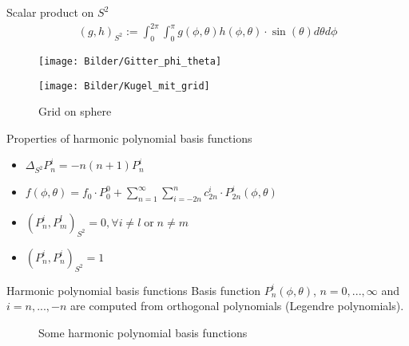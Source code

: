 \begin{frame}
	Scalar product on $S^2$
	\begin{align*}
		(g,h)_{S^2} := \int_{0}^{2\pi} \int_{0}^{\pi} g(\phi, \theta) h(\phi, \theta) \cdot \sin(\theta) d\theta d\phi
	\end{align*}

	\begin{figure}
		\small
		\begin{minipage}{0.46\textwidth}
			\texttt{[image: Bilder/Gitter\_phi\_theta]}
		\end{minipage}
		\hfill 
		\begin{minipage}{0.5\textwidth}
			\texttt{[image: Bilder/Kugel\_mit\_grid]}
		\end{minipage}
	\caption{Grid on sphere}
	\end{figure}
\end{frame}




\begin{frame}{Properties of harmonic polynomial basis functions}
	\begin{itemize}
		\item $\Delta_{S^2}P^i_n = -n(n+1) P^i_n$
		\vspace{12pt}
		\item $	f(\phi, \theta) = f_0 \cdot P_0^0 + \sum_{n=1}^{\infty} \sum_{i=-2n}^{n} c^i_{2n} \cdot P^i_{2n}(\phi, \theta)$
		\vspace{12pt}
		\item $(P^i_n, P^l_m)_{S^2} = 0, \forall i \neq l \; \text{or} \; n \neq m$
		\vspace{12pt}
		\item $	(P^i_n, P^i_n)_{S^2} = 1$
	\end{itemize}
\end{frame}

\begin{frame}{Harmonic polynomial basis functions}
	Basis function ${P}^{i}_{n}(\phi, \theta)$, $n = 0, ..., \infty$ and $i = n, ..., -n$ are computed from orthogonal polynomials (Legendre polynomials). 
	\vspace{20pt}
	\begin{figure}
		\centering
		\qquad
		\qquad
		\qquad
		\caption{Some harmonic polynomial basis functions}
	\end{figure}
\end{frame}


